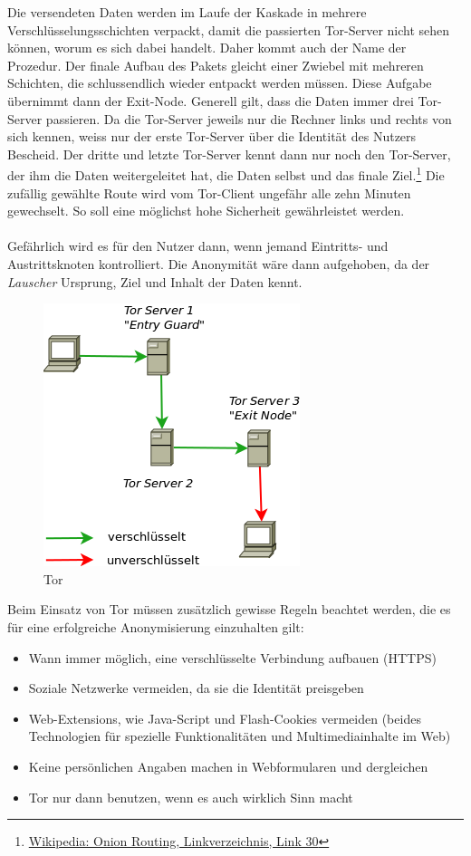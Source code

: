 Die versendeten Daten werden im Laufe der Kaskade in mehrere Verschlüsselungsschichten verpackt, damit die passierten Tor-Server nicht sehen können, worum es sich dabei handelt. Daher kommt auch der Name der Prozedur. Der finale Aufbau des Pakets gleicht einer Zwiebel mit mehreren Schichten, die  schlussendlich wieder entpackt werden müssen. Diese Aufgabe übernimmt dann der Exit-Node. Generell gilt, dass die Daten immer drei Tor-Server passieren. Da die Tor-Server jeweils nur die Rechner links und rechts von sich kennen, weiss nur der erste Tor-Server über die Identität des Nutzers Bescheid. Der dritte und letzte Tor-Server kennt dann nur noch den Tor-Server, der ihm die Daten weitergeleitet hat, die Daten selbst und das finale Ziel.\footnote{\hyperlink{link30}{Wikipedia: Onion Routing, Linkverzeichnis, Link 30}}
Die zufällig gewählte Route wird vom Tor-Client ungefähr alle zehn Minuten gewechselt. So soll eine möglichst hohe Sicherheit gewährleistet werden.
\\
\\
Gefährlich wird es für den Nutzer dann, wenn jemand Eintritts- und Austrittsknoten kontrolliert. Die Anonymität wäre dann aufgehoben, da der \textit{Lauscher} Ursprung, Ziel und Inhalt der Daten kennt.

\begin{figure}[H]
\centering
\includegraphics[scale=0.7]{images/tor}
\caption{Tor}
\end{figure}

Beim Einsatz von Tor müssen zusätzlich gewisse Regeln beachtet werden, die es für eine erfolgreiche Anonymisierung einzuhalten gilt:
\begin{itemize}
\item Wann immer möglich, eine verschlüsselte Verbindung aufbauen (HTTPS)
\item Soziale Netzwerke vermeiden, da sie die Identität preisgeben
\item Web-Extensions, wie Java-Script und Flash-Cookies vermeiden (beides Technologien für spezielle Funktionalitäten und Multimediainhalte im Web)
\item Keine persönlichen Angaben machen in Webformularen und dergleichen
\item Tor nur dann benutzen, wenn es auch wirklich Sinn macht
\end{itemize}

